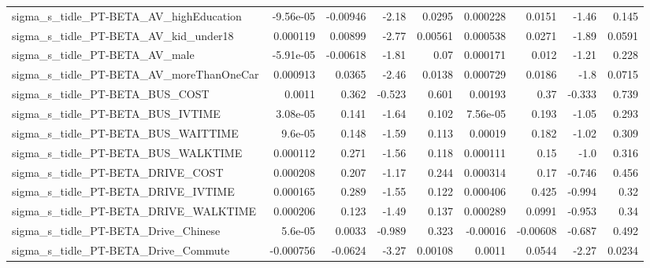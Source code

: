 \begin{tabular}{lrrrrrrrr}
sigma\_s\_tidle\_PT-BETA\_AV\_highEducation             &   -9.56e-05 &     -0.00946 &    -2.18 &   0.0295 &   0.000228 &      0.0151 &        -1.46 &         0.145 \\
sigma\_s\_tidle\_PT-BETA\_AV\_kid\_under18               &    0.000119 &      0.00899 &    -2.77 &  0.00561 &   0.000538 &      0.0271 &        -1.89 &        0.0591 \\
sigma\_s\_tidle\_PT-BETA\_AV\_male                      &   -5.91e-05 &     -0.00618 &    -1.81 &     0.07 &   0.000171 &       0.012 &        -1.21 &         0.228 \\
sigma\_s\_tidle\_PT-BETA\_AV\_moreThanOneCar            &    0.000913 &       0.0365 &    -2.46 &   0.0138 &   0.000729 &      0.0186 &         -1.8 &        0.0715 \\
sigma\_s\_tidle\_PT-BETA\_BUS\_COST                     &      0.0011 &        0.362 &   -0.523 &    0.601 &    0.00193 &        0.37 &       -0.333 &         0.739 \\
sigma\_s\_tidle\_PT-BETA\_BUS\_IVTIME                   &    3.08e-05 &        0.141 &    -1.64 &    0.102 &   7.56e-05 &       0.193 &        -1.05 &         0.293 \\
sigma\_s\_tidle\_PT-BETA\_BUS\_WAITTIME                 &     9.6e-05 &        0.148 &    -1.59 &    0.113 &    0.00019 &       0.182 &        -1.02 &         0.309 \\
sigma\_s\_tidle\_PT-BETA\_BUS\_WALKTIME                 &    0.000112 &        0.271 &    -1.56 &    0.118 &   0.000111 &        0.15 &         -1.0 &         0.316 \\
sigma\_s\_tidle\_PT-BETA\_DRIVE\_COST                   &    0.000208 &        0.207 &    -1.17 &    0.244 &   0.000314 &        0.17 &       -0.746 &         0.456 \\
sigma\_s\_tidle\_PT-BETA\_DRIVE\_IVTIME                 &    0.000165 &        0.289 &    -1.55 &    0.122 &   0.000406 &       0.425 &       -0.994 &          0.32 \\
sigma\_s\_tidle\_PT-BETA\_DRIVE\_WALKTIME               &    0.000206 &        0.123 &    -1.49 &    0.137 &   0.000289 &      0.0991 &       -0.953 &          0.34 \\
sigma\_s\_tidle\_PT-BETA\_Drive\_Chinese                &     5.6e-05 &       0.0033 &   -0.989 &    0.323 &   -0.00016 &    -0.00608 &       -0.687 &         0.492 \\
sigma\_s\_tidle\_PT-BETA\_Drive\_Commute                &   -0.000756 &      -0.0624 &    -3.27 &  0.00108 &     0.0011 &      0.0544 &        -2.27 &        0.0234 \\

\end{tabular}
